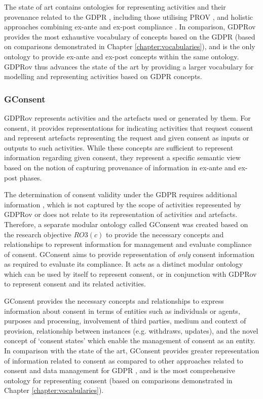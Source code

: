 The state of art contains ontologies for representing activities and their provenance related to the GDPR \cite{pasquier_data_2018,palmirani_pronto_2018-1}, including those utilising PROV \cite{belhajjame_provenance_2018,bonatti_special_2018-1}, and holistic approaches combining ex-ante and ex-post compliance \cite{dullaert_d3.4_2019}.
In comparison, GDPRov provides the most exhaustive vocabulary of concepts based on the GDPR (based on comparisons demonstrated in Chapter \ref{chapter:vocabularies}), and is the only ontology to provide ex-ante and ex-post concepts within the same ontology.
GDPRov thus advances the state of the art by providing a larger vocabulary for modelling and representing activities based on GDPR concepts.

\subsubsection{GConsent}
GDPRov represents activities and the artefacts used or generated by them.
For consent, it provides representations for indicating activities that request consent and represent artefacts representing the request and given consent as inputs or outputs to such activities.
While these concepts are sufficient to represent information regarding given consent, they represent a specific semantic view based on the notion of capturing provenance of information in ex-ante and ex-post phases.

The determination of consent validity under the GDPR requires additional information \cite{politou_forgetting_2018,article_29_data_protection_working_party_guidelines_2018}, which is not captured by the scope of activities represented by GDPRov or does not relate to its representation of activities and artefacts.
Therefore, a separate modular ontology called GConsent was created based on the research objective $RO3(c)$ to provide the necessary concepts and relationships to represent information for management and evaluate compliance of consent.
GConsent aims to provide representation of \textit{only} consent information as required to evaluate its compliance. It acts as a distinct modular ontology which can be used by itself to represent consent, or in conjunction with GDPRov to represent consent and its related activities.

GConsent provides the necessary concepts and relationships to express information about consent in terms of entities such as individuals or agents, purposes and processing, involvement of third parties, medium and context of provision, relationship between instances (e.g. withdraws, updates), and the novel concept of `consent states' which enable the management of consent as an entity. 
In comparison with the state of the art, GConsent provides greater representation of information related to consent as compared to other approaches related to consent and data management for GDPR \cite{peras_guidelines_2018}, and is the most comprehensive ontology for representing consent (based on comparisons demonstrated in Chapter \ref{chapter:vocabularies}).

